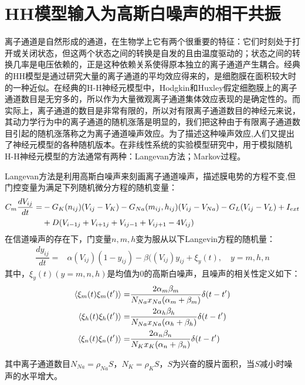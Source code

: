 \documentclass[
    bachelor,
    nofont, %
    pdflinks,
    ]{xjtuthesis}
\begin{document}
\section{HH模型输入为高斯白噪声的相干共振}

离子通道是自然形成的通道，在生物学上它有两个很重要的特征：它们时刻处于打开或关闭状态，但这两个状态之间的转换是自发的且由温度驱动的；状态之间的转换几率是电压依赖的，正是这种依赖关系使得原本独立的离子通道产生耦合。经典的HH模型是通过研究大量的离子通道的平均效应得来的，是细胞膜在面积较大时的一种近似。在经典的H-H神经元模型中，Hodgkin和Huxley假定细胞膜上的离子通道数目是无穷多的，所以作为大量微观离子通道集体效应表现的是确定性的。而实际上，离子通道的数目是非常有限的，所以对有限离子通道数目的神经元来说，其动力学行为中的离子通道的随机涨落是明显的，我们把这种由于有限离子通道数目引起的随机涨落称之为离子通道噪声效应。为了描述这种噪声效应,人们又提出了神经元模型的各种随机版本。在非线性系统的实验模型研究中，用于模拟随机H-H神经元模型的方法通常有两种：Langevan方法；Markov过程。

\medskip

Langevan方法是利用高斯白噪声来刻画离子通道噪声，描述膜电势的方程不变,但门控变量为满足下列随机微分方程的随机变量：
\begin{align}
\notag C_m \dfrac{dV_{ij}}{dt} = &- G_K(n_{ij})(V_{ij}-V_K)-G_{Na}(m_{ij},h_{ij})(V_{ij}-V_{Na}) - G_L(V_{ij}-V_L)+ I_{ext}\\
&+D(V_{i-1j}+V_{i+1j}+V_{ij-1}+V_{ij+1}-4V_{ij})
\end{align}
在信道噪声的存在下，门变量$n,m,h$变为服从以下Langevin方程的随机量：
\begin{align}
 \dfrac{dy_{ij}}{dt} = &\alpha (V_{ij})(1-y_{ij})-\beta ((V_{ij})y_{ij}+ \xi_y(t), \quad y=m,h,n
\end{align}
其中，$\xi_y(t)(y=m,n,h)$是均值为0的高斯白噪声，且噪声的相关性定义如下：
\begin{align}
\notag \left \langle \xi_m(t)\xi_m(t') \right \rangle = & \dfrac{2\alpha_m \beta_m}{N_{Na}x_{Na}(\alpha_m+ \beta_m)} \delta(t-t') \\
\left \langle \xi_h(t)\xi_h(t') \right \rangle = &\dfrac{2\alpha_h \beta_h}{N_{Na}x_{Na}(\alpha_h+ \beta_h)} \delta(t-t') \\
\notag \left \langle \xi_n(t)\xi_n(t') \right \rangle = & \dfrac{2\alpha_n \beta_n}{N_{K}x_{K}(\alpha_n+ \beta_n)} \delta(t-t')
\end{align}

其中离子通道数目$N_{Na}=\rho_{Na}S$，$N_{K}=\rho_{K}S$，$S$为兴奋的膜片面积，当$S$减小时噪声的水平增大。\\
\end{document}
